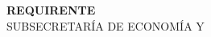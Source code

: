\documentclass[12pt, oneside]{article} %
\begin{document}
\begin{titlepage}
\noindent
\begin{minipage}{\textwidth}
 \vspace*{15mm} 
 \begin{flushright}
 \fontsize{8.5pt}{8pt}\selectfont
 \textbf{REQUIRENTE} \\ 
 SUBSECRETARÍA DE ECONOMÍA Y  \\  

\end{flushright}
\end{minipage}
\end{titlepage}
\end{document}
